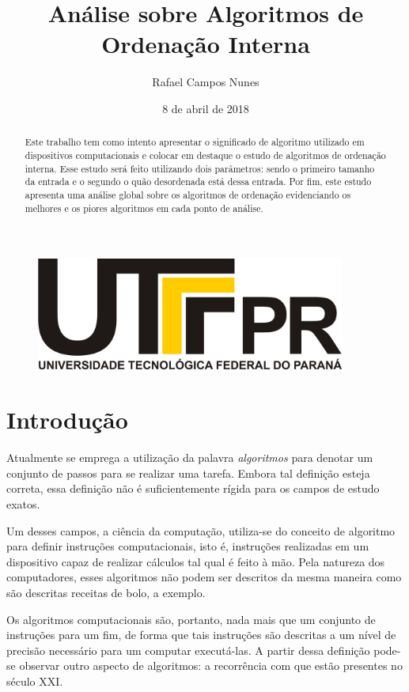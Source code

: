 \documentclass[a4paper, 12pt]{report}
\author{Rafael Campos Nunes}
\date{8 de abril de 2018}
\title{Análise sobre Algoritmos de Ordenação Interna}
\begin{document}
\maketitle
\begin{figure}
  \centering
  \includegraphics[width=4in]{./img/utfpr_black.png}
\end{figure}

\begin{abstract}
Este trabalho tem como intento apresentar o significado de algoritmo utilizado
em dispositivos computacionais e colocar em destaque o estudo de algoritmos de
ordenação interna. Esse estudo será feito utilizando dois parâmetros: sendo o
primeiro  tamanho da entrada e o segundo o quão desordenada está dessa entrada.
Por fim, este estudo apresenta uma análise global sobre os algoritmos de
ordenação evidenciando os melhores e os piores algoritmos em cada ponto de
análise.
\end{abstract}

\onehalfspacing

\setcounter{tocdepth}{2}
\tableofcontents

\part{Introdução}
\label{sec-1}
Atualmente se emprega a utilização da palavra \emph{algoritmos} para denotar um
conjunto de passos para se realizar uma tarefa. Embora tal definição esteja
correta, essa definição não é suficientemente rígida para os campos de estudo
exatos.

Um desses campos, a ciência da computação, utiliza-se do conceito de algoritmo
para definir instruções computacionais, isto é, instruções realizadas em um
dispositivo capaz de realizar cálculos tal qual é feito à mão. Pela natureza
dos computadores, esses algoritmos não podem ser descritos da mesma maneira
como são descritas receitas de bolo, a exemplo.

Os algoritmos computacionais são, portanto, nada mais que um conjunto de
instruções para um fim, de forma que tais instruções são descritas a um nível
de precisão necessário para um computar executá-las. A partir dessa definição
pode-se observar outro aspecto de algoritmos: a recorrência com que estão
presentes no século XXI.
\end{document}
